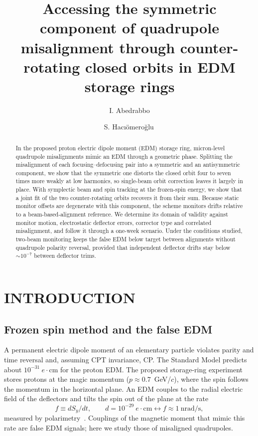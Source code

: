 \documentclass[aps,prab,reprint,superscriptaddress,nofootinbib]{revtex4-2}
\begin{document}
\title{Accessing the symmetric component of quadrupole misalignment through
counter-rotating closed orbits in EDM storage rings}

\author{I. Abedrabbo}
\author{S. Hac{\i}\"omero\u{g}lu\,}

\begin{abstract}
In the proposed proton electric dipole moment (EDM) storage ring, micron-level quadrupole misalignments
mimic an EDM through a geometric phase. Splitting the misalignment of each focusing--defocusing pair into a
symmetric and an antisymmetric component, we show that the symmetric one distorts the closed orbit four to
seven times more weakly at low harmonics, so single-beam orbit correction leaves it largely in place. With
symplectic beam and spin tracking at the frozen-spin energy, we show that a joint fit of the two
counter-rotating orbits recovers it from their sum. Because static monitor offsets are degenerate with this
component, the scheme monitors drifts relative to a beam-based-alignment reference. We determine its domain
of validity against monitor motion, electrostatic deflector errors, corrector type and correlated
misalignment, and follow it through a one-week scenario. Under the conditions studied, two-beam monitoring
keeps the false EDM below target between alignments without quadrupole polarity reversal, provided that
independent deflector drifts stay below $\sim10^{-7}$ between deflector trims.
\end{abstract}
\maketitle

\section{INTRODUCTION}
\label{sec:intro}
\subsection{Frozen spin method and the false EDM}
A permanent electric dipole moment of an elementary particle violates parity and time reversal and,
assuming CPT invariance, CP. The Standard Model predicts about $10^{-31}~e\cdot$cm for the proton EDM. The
proposed storage-ring experiment~\cite{srEDM,omarov} stores protons at the magic momentum
($p\approx0.7$~GeV/$c$), where the spin follows the momentum in the horizontal plane. An EDM couples to the
radial electric field of the deflectors and tilts the spin out of the plane at the rate
\begin{equation}
f \equiv dS_y/dt, \qquad d=10^{-29}~e\cdot\text{cm} \longleftrightarrow f \approx 1~\text{nrad/s},
\end{equation}
measured by polarimetry~\cite{polarimeter}. Couplings of the magnetic moment that mimic this rate are false
EDM signals; here we study those of misaligned quadrupoles.
\end{document}
